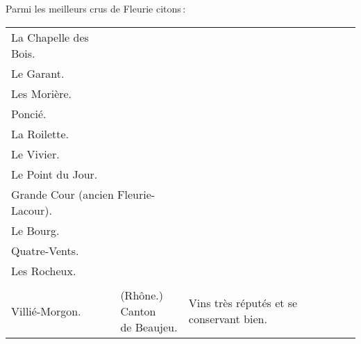 \medskip
Parmi les meilleurs crus de Fleurie citons :
\medskip

\scriptsize
\begin{longtable}{m{12em}m{9em}m{13em}}                                                    
  La Chapelle des Bois.                 &                     &                                                        \\
  Le Garant.                            &                     &                                                        \\
  Les Morière.                          &                     &                                                        \\
  Poncié.                               &                     &                                                        \\
  La Roilette.                          &                     &                                                        \\
  Le Vivier.                            &                     &                                                        \\
  Le Point du Jour.                     &                     &                                                        \\
  \multicolumn{2}{l}{Grande Cour (ancien Fleurie-Lacour).}    &                                                        \\
  Le Bourg.                             &                     &                                                        \\
  Quatre-Vents.                         &                     &                                                        \\
  Les Rocheux.                          &                     &                                                        \\
                                        &                     &                                                        \\
  Villié-Morgon.                        & \makecell{(Rhône.)                                       
                                          \\ Canton                  
                                          \\ de Beaujeu.}     & Vins très réputés et se conservant bien.               \\
\end{longtable}                                                                                                         
\normalsize

